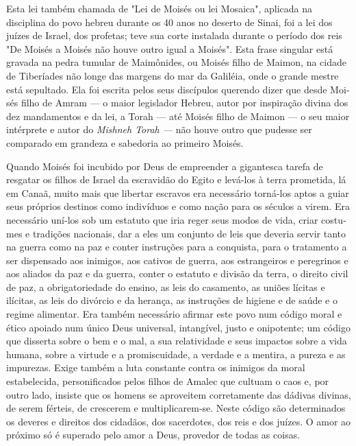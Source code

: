 \begin{itemize}
Esta lei também chamada de "Lei de Moisés ou lei Mosaica", aplicada na
disciplina do povo hebreu durante os 40 anos no deserto de Sinai, foi a
lei dos juízes de Israel, dos profetas; teve sua corte instalada durante
o período dos reis
"De Moisés a Moisés não houve outro igual a Moisés". Esta frase
singu­lar está gravada na pedra tumular de Maimônides, ou Moisés filho
de Maimon, na cidade de Tiberíades não longe das margens do mar da
Galiléia, onde o grande mestre está sepultado. Ela foi escrita pelos
seus discípulos querendo dizer que desde Moi­sés filho de Amram --- o
maior legislador Hebreu, autor por inspiração divina dos dez mandamentos
e da lei, a Torah --- até Moisés filho de Maimon --- o seu maior
intérprete e autor do \emph{Mishneh Torah ---} não houve outro que
pudesse ser compara­do em grandeza e sabedoria ao primeiro Moisés.

Quando Moisés foi incubido por Deus de empreender a gigantesca tare­fa
de resgatar os filhos de Israel da escravidão do Egito e levá-los à
terra prometida, lá em Canaã, muito mais que libertar escravos era
necessário torná-los aptos a guiar seus próprios destinos como
indivíduos e como nação para os séculos a virem. Era necessário uní-los
sob um estatuto que iria reger seus modos de vida, criar costu­mes e
tradições nacionais, dar a eles um conjunto de leis que deveria servir
tanto na guerra como na paz e conter instruções para a conquista, para o
tratamento a ser dispensado aos inimigos, aos cativos de guerra, aos
estrangeiros e peregrinos e aos aliados da paz e da guerra, conter o
estatuto e divisão da terra, o direito civil de paz, a obrigatoriedade
do ensino, as leis do casamento, as uniões lícitas e ilícitas, as leis
do divórcio e da herança, as instruções de higiene e de saúde e o regime
alimentar. Era também necessário afirmar este povo num código moral e
ético apoia­do num único Deus universal, intangível, justo e onipotente;
um código que dis­serta sobre o bem e o mal, a sua relatividade e seus
impactos sobre a vida humana, sobre a virtude e a promiscuidade, a
verdade e a mentira, a pureza e as impurezas. Exige também a luta
constante contra os inimigos da moral estabelecida, personifi­cados
pelos filhos de Amalec que cultuam o caos e, por outro lado, insiste que
os homens se aproveitem corretamente das dádivas divinas, de serem
férteis, de cres­cerem e multiplicarem-se. Neste código são determinados
os deveres e direitos dos cidadãos, dos sacerdotes, dos reis e dos
juízes. O amor ao próximo só é superado pelo amor a Deus, provedor de
todas as coisas.


\end{itemize}
